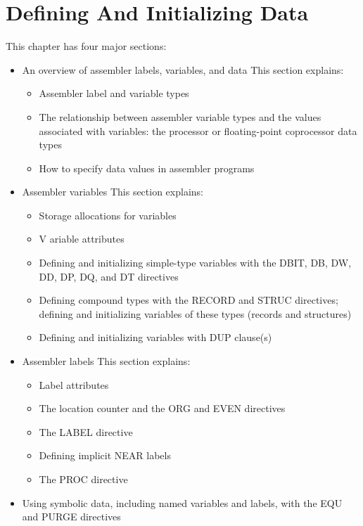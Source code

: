  

\chapter[Defining And Initializing Data]{Defining And Initializing Data}

This chapter has four major sections:
\begin{itemize}
\item An overview of assembler labels, variables, and data
This section explains:
\begin{itemize}
\item Assembler label and variable types
\item The relationship between assembler variable types and the values associated with variables: the processor or floating-point coprocessor data types
\item How to specify data values in assembler programs
\end{itemize}
\item Assembler variables
This section explains:
\begin{itemize}
\item Storage allocations for variables
\item V ariable attributes
\item Defining and initializing simple-type variables with the DBIT, DB, DW, DD, DP, DQ, and DT directives
\item Defining compound types with the RECORD and STRUC directives; defining and initializing variables of these types (records and structures)
\item Defining and initializing variables with DUP clause(s)
\end{itemize}
\item Assembler labels
This section explains:
\begin{itemize}
\item Label attributes
\item The location counter and the ORG and EVEN directives
\item The LABEL directive
\item Defining implicit NEAR labels
\item The PROC directive
\end{itemize}
\item Using symbolic data, including named variables and labels, with the EQU and PURGE directives
\end{itemize}

